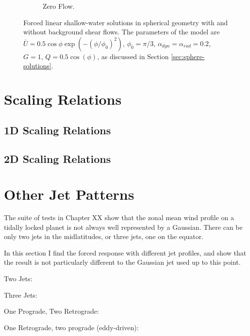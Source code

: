 \begin{figure}
\begin{subfigure}[b]{0.33\textwidth}
    \caption{Zero Flow.}
    \label{fig:spherical-shear-2d}
  \end{subfigure}
  \caption{Forced linear shallow-water solutions in spherical geometry with and without background shear flows. The parameters of the model are $\bar{U}=0.5 \cos\phi \exp(-(\phi/\phi_{0})^{2})$, $\phi_{0}=\pi / 3$, $\alpha_{dyn}=\alpha_{rad}=0.2$, $G=1$, $Q=0.5\cos(\phi)$, as discussed in Section \ref{sec:sphere-solutions}.}\label{fig:spherical-tests.}
  \label{fig:spherical-tests}
\end{figure}





\section{Scaling Relations}

\subsection{1D Scaling Relations}

\subsection{2D Scaling Relations}



\section{Other Jet Patterns}

The suite of tests in Chapter XX show that the zonal mean wind profile on a tidally locked planet is not always well represented by a Gaussian. There can be only two jets in the midlatitudes, or three jets, one on the equator.

In this section I find the forced response with different jet profiles, and show that the result is not particularly different to the Gaussian jet used up to this point.

Two Jets:

Three Jets:

One Prograde, Two Retrograde:

One Retrograde, two prograde (eddy-driven):










% 
% 

